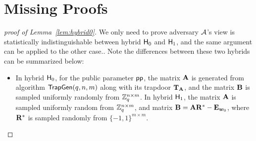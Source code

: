 \section{Missing Proofs} \label{sec:proof}
\begin{proof}[proof of Lemma~\ref{lem:hybrid0}]
We only need to prove adversary $\mathcal{A}$'s view is statistically indistinguishable between hybrid $\mathsf{H}_0$ and $\mathsf{H}_1$, and the same argument can be applied to the other case.. Note the differences between these two hybrids can be summarized below:
\begin{itemize}[leftmargin=*]
 \item In hybrid $\mathsf{H}_0$, for the public parameter $\mathsf{pp}$, the matrix $\mathbf{A}$ is generated from algorithm $\mathsf{TrapGen}(q, n, m)$ along with its trapdoor $\mathbf{T}_{\mathbf{A}}$, and the matrix $\mathbf{B}$ is sampled uniformly randomly from $\mathbb{Z}_q^{n \times m}$. In hybrid $\mathsf{H}_1$, the matrix $\mathbf{A}$ is sampled uniformly random from $\mathbb{Z}_q^{n \times m}$, and matrix $\mathbf{B} = \mathbf{A} \mathbf{R}^* - \mathbf{E}_{\boldsymbol{w}_0}$, where $\mathbf{R}^*$ is sampled randomly from $\{-1, 1\}^{m \times m}$.
 

\end{itemize}
\end{proof}

